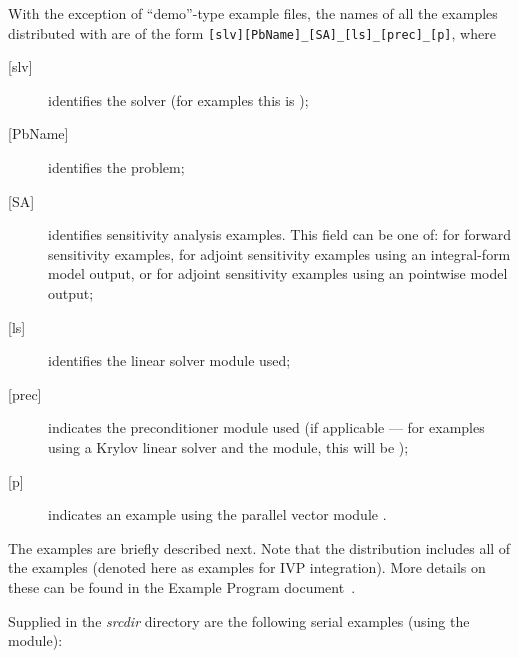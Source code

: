 \vspace{0.2in}\noindent
With the exception of ``demo''-type example files, the names of all the examples 
distributed with {\sundials} are of the form \verb![slv][PbName]_[SA]_[ls]_[prec]_[p]!, 
where
\begin{description}
\item [{[slv]}] identifies the solver (for {\idas} examples this is );
\item [{[PbName]}] identifies the problem;
\item [{[SA]}] identifies sensitivity analysis examples. This field can be one
  of:  for forward sensitivity examples,  for adjoint sensitivity
  examples using an integral-form model output, or  for adjoint sensitivity
  examples using an pointwise model output;
\item [{[ls]}] identifies the linear solver module used;
\item [{[prec]}] indicates the {\idas} preconditioner module used
  (if applicable --- for examples using a Krylov linear solver
  and the {\idabbdpre} module, this will be );
\item [{[p]}] indicates an example using the parallel vector module {\nvecp}.
\end{description}

\vspace{0.2in}\noindent
The examples are briefly described next.
Note that the {\idas} distribution includes all of the {\ida} {\CC}
examples (denoted here as examples for IVP integration). More details on
these can be found in the {\ida} Example Program document~\cite{ida_ex}.


\vspace{0.2in}\noindent
Supplied in the {\em srcdir} directory are the
following serial examples (using the {\nvecs} module):

